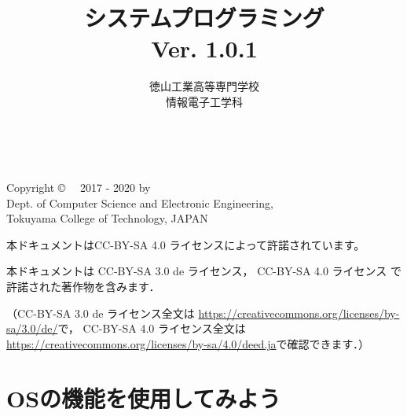 \documentclass[a4paper,11pt,twocolumn]{ltjsbook}      %
\begin{document}
\frontmatter
\title{システムプログラミング\\Ver. 1.0.1}
\author{徳山工業高等専門学校\\情報電子工学科}
\date{}
\maketitle

\thispagestyle{empty}
\onecolumn
~
\vfill
\begin{flushleft}
Copyright \copyright ~~ 2017 - 2020 by \\
Dept. of Computer Science and Electronic Engineering, \\
Tokuyama College of Technology, JAPAN
\end{flushleft}

\vspace{0.8cm}
本ドキュメントはCC-BY-SA 4.0 ライセンスによって許諾されています。

本ドキュメントは
CC-BY-SA 3.0 de ライセンス，
CC-BY-SA 4.0 ライセンス
で許諾された著作物を含みます．

（CC-BY-SA 3.0 de ライセンス全文は
\url{https://creativecommons.org/licenses/by-sa/3.0/de/}で，
CC-BY-SA 4.0 ライセンス全文は
\url{https://creativecommons.org/licenses/by-sa/4.0/deed.ja}で確認できます．）

\setcounter{tocdepth}{2}
\tableofcontents

\mainmatter

\part{OSの機能を使用してみよう}
\setcounter{page}{23}               %
\end{document}

